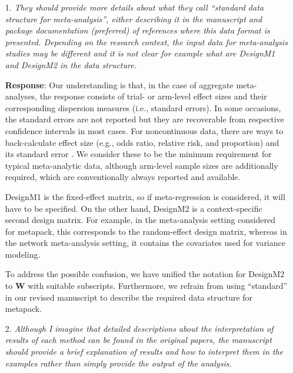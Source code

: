 \documentclass[11pt]{article}
\newcommand{\1}{{\bf{{1}}}}
\begin{document}
\begin{itemize}
    \item[1.]  {\it They should provide more details about what they call ``standard data structure for meta-analysis'', either describing it in the manuscript and package documentation (preferred) of references where this data format is presented. Depending on the research context, the input data for meta-analysis studies may be different and it is not clear for example what are DesignM1 and DesignM2 in the data structure.}

\medskip
\noindent
{\bf Response}: Our understanding is that, in the case of aggregate meta-analyses, the response consists of trial- or arm-level
effect sizes and their corresponding dispersion measures (i.e., standard errors). In some occasions,
the standard errors are not reported but they are recoverable from respective confidence intervals in most cases.
For noncontinuous data, there are ways to back-calculate effect size (e.g., odds ratio, relative risk, and proportion)
and its standard error \citep{10.1371/journal.pone.0222690}. We consider these to be the minimum requirement for typical meta-analytic data,
although arm-level sample sizes are additionally required, which are conventionally always reported and available.

DesignM1 is the fixed-effect matrix, so if meta-regression is considered, it will have to be specified. On the other hand, DesignM2 is a context-specific second design matrix. For example, in the meta-analysis setting considered for metapack, this corresponds to the random-effect design matrix, whereas in the network meta-analysis setting, it contains the covariates used for variance modeling.

To address the possible confusion, we have unified the notation for DesignM2 to $\bm{W}$ with suitable subscripts. Furthermore, we refrain from using ``standard'' in our revised manuscript to describe the required data structure for metapack.



\item[2.] {\it Although I imagine that detailed descriptions about the interpretation of results of each method can be found in the original papers, the manuscript should provide a brief explanation of results and how to interpret them in the examples rather than simply provide the output of the analysis.}


\end{itemize}
\end{document}
